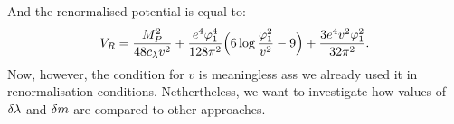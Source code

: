 And the renormalised potential is equal to:
\begin{align}
V_R = \frac{M_P^2}{48c_\lambda v^2}+\frac{e^4\varphi_1^4}{128\pi^2}\Big(6\log{
\frac{\varphi_1^2}{v^2}} - 9\Big)+\frac{3e^4v^2\varphi_1^2}{32\pi^2}.
\end{align}
Now, however, the condition for $v$ is meaningless ass we already used it in renormalisation 
conditions. Nethertheless, we want to investigate how values of $\delta\lambda$ and $\delta m$ are compared 
to other approaches.
